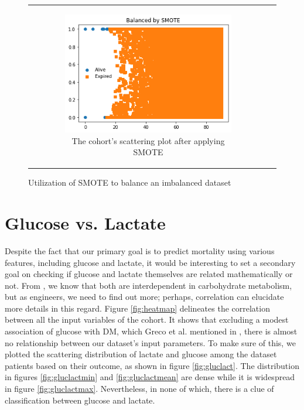 \begin{figure}[H]
\begin{tabular}{@{}cc@{}}
\begin{subfigure}{0.5\textwidth}
  \centering
  \includegraphics[width=7.5cm]{fig/chapter4/SMOTE Scattering Plot.png}
  \caption{\footnotesize{The cohort's scattering plot after applying \acrshort{SMOTE}}}
  \label{fig:balanced}
\end{subfigure} \\
\end{tabular}
\caption{Utilization of \acrshort{SMOTE} to balance an imbalanced dataset}
\label{fig:smote}
\end{figure}

\section{Glucose vs. Lactate}
Despite the fact that our primary goal is to predict mortality using various features, including glucose and lactate, it would be interesting to set a secondary goal on checking if glucose and lactate themselves are related mathematically or not. From \cite{greco_diabetes_2018}, we know that both are interdependent in carbohydrate metabolism, but as engineers, we need to find out more; perhaps, correlation can elucidate more details in this regard. Figure \ref{fig:heatmap} delineates the correlation between all the input variables of the cohort. It shows that excluding a modest association of glucose with \acrshort{DM}, which Greco et al. mentioned in \cite{greco_diabetes_2018}, there is almost no relationship between our dataset's input parameters. To make sure of this, we plotted the scattering distribution of lactate and glucose among the dataset patients based on their outcome, as shown in figure \ref{fig:gluclact}. The distribution in figures \ref{fig:gluclactmin} and \ref{fig:gluclactmean} are dense while it is widespread in figure \ref{fig:gluclactmax}. Nevertheless, in none of which, there is a clue of classification between glucose and lactate.

